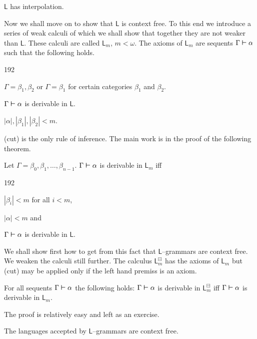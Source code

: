 \begin{thm}[Roorda]
$\mathsf{L}$ has interpolation.
\proofend
\end{thm}
Now we shall move on to show that $\mathsf{L}$ is context
free. To this end we introduce a series of weak calculi of which we
shall show that together they are not weaker than $\mathsf{L}$.
These calculi are called $\mathsf{L}_m$, $m < \omega$. 
The axioms of $\mathsf{L}_m$ are sequents $\Gamma \boldsymbol{\vdash} \alpha$ such that
the following holds.
\begin{dingautolist}{192}
\item $\Gamma = \beta_1, \beta_2$ or $\Gamma = \beta_1$
for certain categories $\beta_1$ and $\beta_2$.
\item $\Gamma \boldsymbol{\vdash} \alpha$ is derivable in $\mathsf{L}$.
\item $|\alpha|, |\beta_1|, |\beta_2| < m$.
\end{dingautolist}
(cut) is the only rule of inference. The main work is in the
proof of the following theorem.
\begin{thm}[Pentus]
\label{reduktion1}
Let $\Gamma = \beta_0,  \beta_1,  \dotsc, \beta_{n-1}$.
$\Gamma \boldsymbol{\vdash} \alpha$ is derivable in $\mathsf{L}_m$ iff
\begin{dingautolist}{192}
\item
$|\beta_i| < m$ for all $i < m$,
\item
$|\alpha| < m$ and
\item
$\Gamma \boldsymbol{\vdash} \alpha$ is derivable in $\mathsf{L}$.
\end{dingautolist}
\end{thm}
We shall show first how to get from this fact that $\mathsf{L}$--grammars
are context free. We weaken the calculi still further. The calculus
$\mathsf{L}_m^{\boxminus}$ 
has the axioms of $\mathsf{L}_m$ but
(cut) may be applied only if the left hand premiss is an axiom.
\begin{lem}
\label{reduktion2}
For all sequents $\Gamma \boldsymbol{\vdash} \alpha$ the following holds:
$\Gamma \boldsymbol{\vdash} \alpha$ is derivable in $\mathsf{L}_m^{\boxminus}$
iff $\Gamma \boldsymbol{\vdash} \alpha$ is derivable in $\mathsf{L}_m$.
\end{lem}
The proof is relatively easy and left as an exercise.
\begin{thm}
The languages accepted by $\mathsf{L}$--grammars are context free.
\end{thm}
